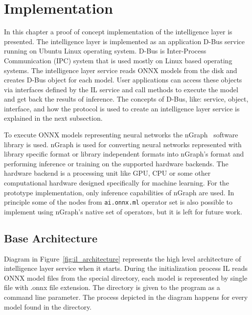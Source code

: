 \documentclass[english, 12pt, a4paper, elec, utf8, online]{aaltothesis}
\begin{document}
\clearpage

\section{Implementation}\label{chapter:implementation}\label{chapter:implementation}
In this chapter a proof of concept implementation of the intelligence layer is presented. The intelligence layer is implemented as an application D-Bus service running on Ubuntu Linux operating system. D-Bus is Inter-Process Communication (IPC) system that is used mostly on Linux based operating systems. The intelligence layer service reads ONNX models from the disk and creates D-Bus object for each model. User applications can access these objects via interfaces defined by the IL service and call methods to execute the model and get back the results of inference. The concepts of D-Bus, like: service, object, interface, and how the protocol is used to create an intelligence layer service is explained in the next subsection. 

To execute ONNX models representing neural networks the nGraph~\cite{cyphers2018intel}  software library is used. nGraph is used for converting neural networks represented with library specific format or library independent formats into nGraph's format and performing inference or training on the supported hardware backends. The hardware backend is a processing unit like GPU, CPU or some other computational hardware designed specifically for machine learning. For the prototype implementation, only inference capabilities of nGraph are used. In principle some of the nodes from \texttt{ai.onnx.ml} operator set is also possible to implement using nGraph’s native set of operators, but it is left for future work.

\subsection{Base Architecture}
Diagram in Figure~\ref{fig:il_architecture} represents the high level architecture of intelligence layer service when it starts. During the initialization process IL reads ONNX model files from the special directory, each model is represented by single file with .onnx file extension. The directory is given to the program as a command line parameter. The process depicted in the diagram happens for every model found in the directory.
\end{document}
